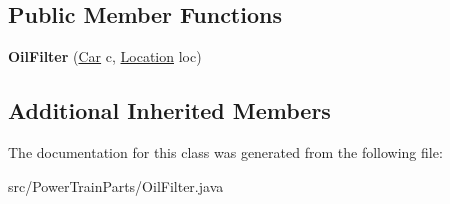 \subsection*{Public Member Functions}
\begin{DoxyCompactItemize}
\item 
\hypertarget{classPowerTrainParts_1_1OilFilter_a5ae9d4b867d983c9a4257c73800e66d6}{}{\bfseries Oil\+Filter} (\hyperlink{classCars_1_1Car}{Car} c, \hyperlink{enumEnums_1_1Location}{Location} loc)\label{classPowerTrainParts_1_1OilFilter_a5ae9d4b867d983c9a4257c73800e66d6}

\end{DoxyCompactItemize}
\subsection*{Additional Inherited Members}


The documentation for this class was generated from the following file\+:\begin{DoxyCompactItemize}
\item 
src/\+Power\+Train\+Parts/Oil\+Filter.\+java\end{DoxyCompactItemize}

